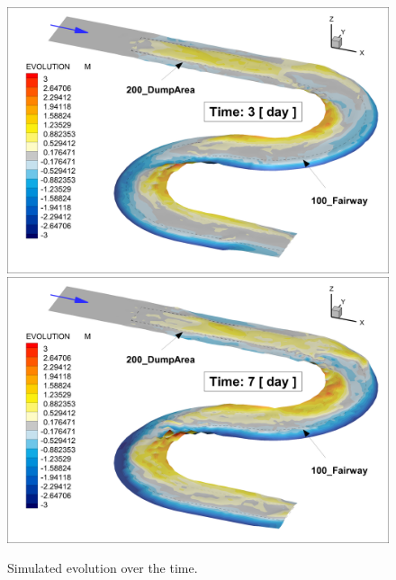 \begin{figure} [!h]
\centering
\includegraphics[scale=0.14]{critDig_Poly_03p0d.png}
\includegraphics[scale=0.14]{critDig_Poly_07p0d.png}
\caption{Simulated evolution over the time.}\label{result34}
\end{figure}

